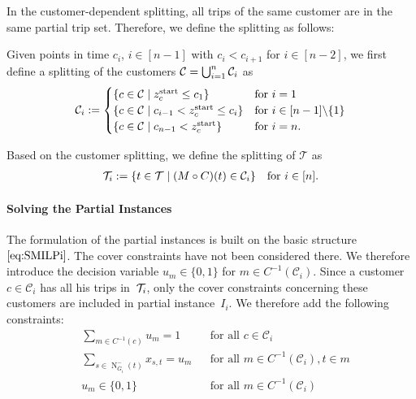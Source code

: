 In the customer-dependent splitting, all trips of the same customer are in the same partial trip set. Therefore, we define the splitting as follows:

\begin{definition}
\label{def:customer_dependent_splitting}

Given points in time $c_i$, $i\in[n-1]$ with $c_i<c_{i+1}$ for $i\in[n-2]$, we first define a splitting of the customers $\mathcal{C}=\bigcup_{i=1}^n\mathcal{C}_i$ as
\begin{align*}
	\mathcal{C}_i := \begin{cases}
		\left\{c\in\mathcal{C}\mid z^{\operatorname{start}}_c\leq c_1\right\} & \text{for } i=1 \\
		\left\{c\in\mathcal{C}\mid c_{i-1}<z^{\operatorname{start}}_c\leq c_i\right\} & \text{for } i\in[n-1]\backslash\{1\} \\
		\left\{c\in\mathcal{C}\mid c_{n-1}<z^{\operatorname{start}}_c\right\} & \text{for } i=n.
	\end{cases}
\end{align*}

Based on the customer splitting, we define the splitting of $\mathcal{T}$ as
\begin{align*}
	\mathcal{T}_i := \left\{t\in\mathcal{T}\mid (M\circ C)(t)\in\mathcal{C}_i\right\} && \text{for } i\in[n].
\end{align*}

\end{definition}

\paragraph{Solving the Partial Instances} \parfill

The formulation of the partial instances is built on the basic structure $\eqref{eq:SMILPi}$. The cover constraints have not been considered there. We therefore introduce the decision variable $u_m\in\{0,1\}$ for $m\in C^{-1}\left(\mathcal{C}_i\right)$. Since a customer $c\in\mathcal{C}_i$ has all his trips in~$\mathcal{T}_i$, only the cover constraints concerning these customers are included in partial instance~$I_i$. We therefore add the following constraints:
\begin{align}
	& \sum_{m\in C^{-1}(c)} u_m = 1 && \text{for all } c\in\mathcal{C}_i \label{eq:CMILP:customer} \\
	& \sum_{s\in\operatorname{N}_{\overline{G}_i}^-(t)} x_{s,t} = u_m && \text{for all } m\in C^{-1}\left(\mathcal{C}_i\right), t\in m \label{eq:CMILP:route} \\
	& u_m\in\{0,1\} && \text{for all } m\in C^{-1}\left(\mathcal{C}_i\right) \label{eq:CMILP:um}
\end{align}

